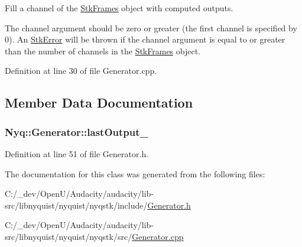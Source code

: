 Fill a channel of the \hyperlink{class_nyq_1_1_stk_frames}{Stk\+Frames} object with computed outputs. 

The {\ttfamily channel} argument should be zero or greater (the first channel is specified by 0). An \hyperlink{class_nyq_1_1_stk_error}{Stk\+Error} will be thrown if the {\ttfamily channel} argument is equal to or greater than the number of channels in the \hyperlink{class_nyq_1_1_stk_frames}{Stk\+Frames} object. 

Definition at line 30 of file Generator.\+cpp.



\subsection{Member Data Documentation}
\subsubsection[{\texorpdfstring{last\+Output\+\_\+}{lastOutput_}}]{ Nyq\+::\+Generator\+::last\+Output\+\_\+\hspace{0.3cm}{\ttfamily [protected]}}\hypertarget{class_nyq_1_1_generator_a185d87cd79f851ad291db3630598e2a7}{}\label{class_nyq_1_1_generator_a185d87cd79f851ad291db3630598e2a7}


Definition at line 51 of file Generator.\+h.



The documentation for this class was generated from the following files\+:\begin{DoxyCompactItemize}
\item 
C\+:/\+\_\+dev/\+Open\+U/\+Audacity/audacity/lib-\/src/libnyquist/nyquist/nyqstk/include/\hyperlink{lib-src_2libnyquist_2nyquist_2nyqstk_2include_2_generator_8h}{Generator.\+h}\item 
C\+:/\+\_\+dev/\+Open\+U/\+Audacity/audacity/lib-\/src/libnyquist/nyquist/nyqstk/src/\hyperlink{lib-src_2libnyquist_2nyquist_2nyqstk_2src_2_generator_8cpp}{Generator.\+cpp}\end{DoxyCompactItemize}
